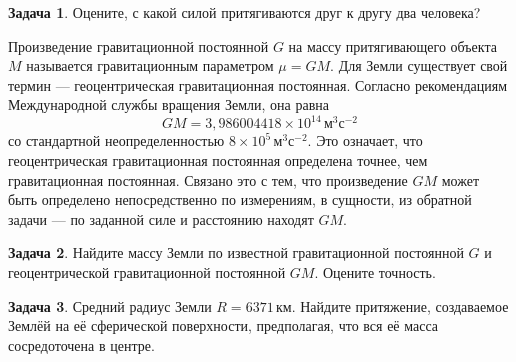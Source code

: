 \documentclass[11pt, a4paper]{article}
\theoremstyle{plain}
\theoremstyle{definition}
\newtheorem{problem}{Задача}[section]
\theoremstyle{remark}
\begin{document}
\begin{problem}
    Оцените, с какой силой притягиваются друг к другу два человека? 
\end{problem}

Произведение гравитационной постоянной $G$ на массу притягивающего объекта $M$ называется
гравитационным параметром $\mu = GM$. Для Земли существует свой термин --- геоцентрическая гравитационная
постоянная. Согласно рекомендациям Международной службы вращения Земли\cite{iers2010}, она равна
\begin{equation*}
    GM = 3,986004418\times10^{14}\,\text{м}^3\text{с}^{-2}
\end{equation*}
со стандартной неопределенностью $8\times10^{5}\,\text{м}^3\text{с}^{-2}$. Это означает, что
геоцентрическая гравитационная постоянная определена точнее, чем гравитационная постоянная. 
Связано это с тем, что произведение $GM$ может быть определено непосредственно по измерениям, 
в сущности, из обратной задачи --- по заданной силе и расстоянию находят $GM$.

\begin{problem}
    Найдите массу Земли по известной гравитационной постоянной $G$ и геоцентрической гравитационной
    постоянной $GM$. Оцените точность.
\end{problem}
\begin{problem}
    Средний радиус Земли $R = 6371\,\text{км}$. Найдите притяжение, создаваемое Землёй
    на её сферической поверхности, предполагая, что вся её масса сосредоточена в центре.
\end{problem}
\end{document}
